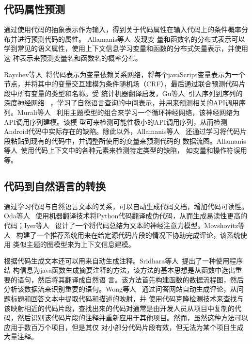 \subsection{代码属性预测}
通过使用代码的抽象表示作为输入，得到关于代码属性在输入代码上的条件概率分布并进行预测代码的属性。
Allamanis等人~\cite{allamanis2014learning,allamanis2015suggesting,allamanis2016convolutional}发现变
量和函数名的分布式表示可以学到常见的语义属性，使用上下文信息学习变量和函数的分布式矢量表示，并使用这
种表示来预测变量名和函数名的概率分布。

Raychev等人~\cite{raychev2015predicting}将代码表示为变量依赖关系网络，将每个javaScript变量表示为一个
节点，并将其中的变量交互建模为条件随机场（CRF），最后通过联合预测代码片段中所有变量的类型和名称。受
统计机器翻译启发，Gu等人~\cite{gu2016deep}引入序列到序列的深度神经网络
~\cite{sutskever2014sequence}，学习了自然语言查询的中间表示，并用来预测相关的API调用序列。Murali等人
~\cite{murali2017finding}利用主题模型的组合来学习一个循环神经网络，该神经网络为API调用序列建模。该模
型可来检测可能性极小的API调用序列，从而检测Android代码中实际存在的缺陷。除此以外，Allamanis等人
~\cite{allamanis2018learning}还通过学习将代码片段粘贴到现有的代码中，并调整所使用的变量来预测代码的
数据流图。Allamanis等人~\cite{allamanis2018learning}使用代码上下文中的各种元素来检测特定类型的缺陷，
如变量和操作符误用等。

\subsection{代码到自然语言的转换}
通过学习代码与自然语言文本的关系，可以自动生成代码文档，增加代码可读性。Oda等人
~\cite{oda2015learning}使用机器翻译技术将Python代码翻译成伪代码，从而生成易读性更高的代码；Iyer等人
~\cite{iyer2016summarizing}设计了一个将代码总结为文本的神经注意力模型。Movshovitz等人
~\cite{movshovitz2013natural}构建了一个推荐系统用来在给定源代码片段的情况下协助完成评论，该系统使用
类似主题的图模型来为上下文信息建模。

根据代码生成文本还可以用来自动生成注释。Sridhara等人~\cite{sridhara2010towards}提出了一种使用程序结
构信息为java函数生成摘要注释的方法，该方法的基本思想是从函数中选出重要的语句，然后将其翻译成自然语
言。该方法首先构建函数的数据流程图，然后分析该数据流来识别重要的语句。Wong等人
~\cite{wong2013autocomment}通过问答网站自动生成评论，从问题标题和回答文本中提取代码和描述的映射，并
使用代码克隆检测技术来查找与该映射相近的代码片段，查找出来的代码对通常是由开发人员从项目中复制的代
码，然后识别该代码片段的注释并重新应用于其他项目。然而，虽然这种方法可以应用于数百万个项目，但是其仅
对小部分代码片段有效，但无法为某个项目生成大量注释。


